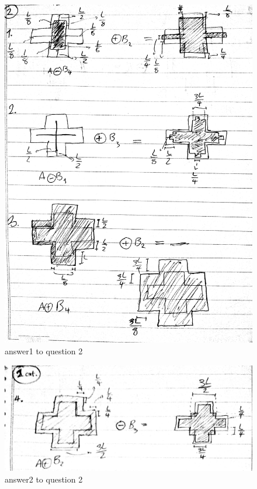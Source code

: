 \documentclass[11pt]{article}
\makeatletter
\def\maxwidth{\ifdim\Gin@nat@width>\linewidth\linewidth
    \else\Gin@nat@width\fi}
\let\Oldincludegraphics\includegraphics
\renewcommand{\includegraphics}[1]{\Oldincludegraphics[width=.8\maxwidth]{#1}}
\makeatother
\begin{document}
    \begin{figure}
\centering
\includegraphics{wiki/2_6.jpg}
\caption{answer1 to question 2}
\end{figure}

\begin{figure}
\centering
\includegraphics{wiki/2_7.jpg}
\caption{answer2 to question 2}
\end{figure}
\end{document}
